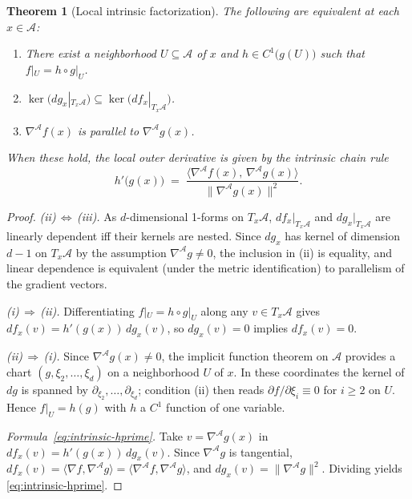 \documentclass[10pt,a4paper]{amsart}
\newtheorem{theorem}{Theorem}
\begin{document}
\begin{theorem}[Local intrinsic factorization]
\label{thm:intrinsic-fact}
The following are equivalent at each $x\in\mathcal{A}$:
\begin{enumerate}
  \item[(i)] There exist a neighborhood $U\subseteq\mathcal{A}$ of $x$ and
    $h\in C^1\bigl(g(U)\bigr)$ such that $f|_U = h\circ g|_U$.
  \item[(ii)] $\ker\!\bigl(dg_x|_{T_x\mathcal{A}}\bigr)\subseteq
    \ker\!\bigl(df_x|_{T_x\mathcal{A}}\bigr)$.
  \item[(iii)] $\nabla^{\!\mathcal{A}} f(x)$ is parallel to
    $\nabla^{\!\mathcal{A}} g(x)$.
\end{enumerate}
When these hold, the local outer derivative is given by the
\emph{intrinsic chain rule}
\begin{equation}
\label{eq:intrinsic-hprime}
  h'\bigl(g(x)\bigr) \;=\;
    \frac{\langle\nabla^{\!\mathcal{A}} f(x),\,\nabla^{\!\mathcal{A}} g(x)\rangle}
         {\|\nabla^{\!\mathcal{A}} g(x)\|^2}.
\end{equation}
\end{theorem}

\begin{proof}
\textit{(ii)\,$\Leftrightarrow$\,(iii).} As $d$-dimensional 1-forms on
$T_x\mathcal{A}$, $df_x|_{T_x\mathcal{A}}$ and $dg_x|_{T_x\mathcal{A}}$
are linearly dependent iff their kernels are nested. Since $dg_x$ has
kernel of dimension $d-1$ on $T_x\mathcal{A}$ by the assumption
$\nabla^{\!\mathcal{A}} g \neq 0$, the inclusion in (ii) is equality, and
linear dependence is equivalent (under the metric identification) to
parallelism of the gradient vectors.

\textit{(i)\,$\Rightarrow$\,(ii).} Differentiating $f|_U =
h\circ g|_U$ along any $v\in T_x\mathcal{A}$ gives
$df_x(v) = h'(g(x))\,dg_x(v)$, so $dg_x(v)=0$ implies $df_x(v)=0$.

\textit{(ii)\,$\Rightarrow$\,(i).} Since $\nabla^{\!\mathcal{A}} g(x)\neq 0$,
the implicit function theorem on $\mathcal{A}$ provides a chart
$(g,\xi_2,\dots,\xi_d)$ on a neighborhood $U$ of $x$. In these coordinates
the kernel of $dg$ is spanned by $\partial_{\xi_2},\dots,\partial_{\xi_d}$;
condition (ii) then reads $\partial f/\partial\xi_i\equiv 0$ for $i\ge 2$
on $U$. Hence $f|_U = h(g)$ with $h$ a $C^1$ function of one variable.

\textit{Formula~\eqref{eq:intrinsic-hprime}.} Take
$v=\nabla^{\!\mathcal{A}} g(x)$ in $df_x(v) = h'(g(x))\,dg_x(v)$. Since
$\nabla^{\!\mathcal{A}} g$ is tangential, $df_x(v) =
\langle\nabla f, \nabla^{\!\mathcal{A}} g\rangle =
\langle\nabla^{\!\mathcal{A}} f, \nabla^{\!\mathcal{A}} g\rangle$, and
$dg_x(v) = \|\nabla^{\!\mathcal{A}} g\|^2$. Dividing yields
\eqref{eq:intrinsic-hprime}.
\end{proof}
\end{document}

